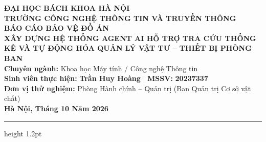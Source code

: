 \documentclass[11pt,a4paper]{article}
\begin{document}
\begin{center}
    {\large\bfseries ĐẠI HỌC BÁCH KHOA HÀ NỘI}\\[0.15cm]
    {\large\bfseries TRƯỜNG CÔNG NGHỆ THÔNG TIN VÀ TRUYỀN THÔNG}\\[0.6cm]
    
    {\Huge\bfseries BÁO CÁO BẢO VỆ ĐỒ ÁN}\\[0.4cm]
    {\LARGE\bfseries XÂY DỰNG HỆ THỐNG AGENT AI HỖ TRỢ TRA CỨU THỐNG KÊ VÀ TỰ ĐỘNG HÓA QUẢN LÝ VẬT TƯ -- THIẾT BỊ PHÒNG BAN}\\[0.6cm]
    
    {\normalsize\textbf{Chuyên ngành:} Khoa học Máy tính / Công nghệ Thông tin}\\[0.2cm]
    {\normalsize\textbf{Sinh viên thực hiện:} \textbf{Trần Huy Hoàng} \quad | \quad \textbf{MSSV:} \textbf{20237337}}\\[0.2cm]
    {\normalsize\textbf{Đơn vị thử nghiệm:} Phòng Hành chính -- Quản trị (Ban Quản trị Cơ sở vật chất)}\\[0.2cm]
    {\normalsize\textbf{Hà Nội, Tháng 10 Năm 2026}}
\end{center}

\vspace{0.2cm}
\hrule height 1.2pt
\vspace{0.4cm}
\end{document}
